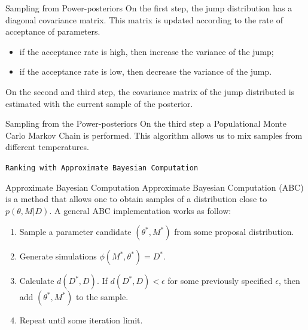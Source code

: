 \documentclass{beamer}
\begin{document}
\begin{frame}{Sampling from Power-posteriors}
On the first step, the jump distribution has a diagonal covariance 
matrix. \pause This matrix is updated according to the rate of 
acceptance of parameters.

\pause
\begin{itemize}
\item{if the acceptance rate is high, then increase the variance of the
    jump;}

\pause
\item{if the acceptance rate is low, then decrease the variance of the 
    jump.}
\end{itemize}

\pause
On the second and third step, the covariance matrix of the jump 
distributed is estimated with the current sample of the posterior.
\end{frame}

\begin{frame}{Sampling from the Power-posteriors}
On the third step a Populational Monte Carlo Markov Chain is performed.
This algorithm allows us to mix samples from different temperatures.
\end{frame}


\begin{frame}{}
\begin{center}
    \texttt{Ranking with Approximate Bayesian Computation}
\end{center}
\end{frame}


\begin{frame}{Approximate Bayesian Computation}
Approximate Bayesian Computation (ABC) is a method that allows one to
obtain samples of a distribution close to $p (\theta, M | D)$. \pause
A general ABC implementation works as follow:

\begin{enumerate}
    \pause
    \item{Sample a parameter candidate $(\theta^*, M^*)$ from some 
        proposal distribution.}
    \pause
    \item{Generate simulations $\phi (M^*, \theta^*) = D^*$.}
    \pause
    \item{Calculate $d (D^*, D).$ If $d (D^*, D) < \epsilon$ for some 
        previously specified $\epsilon$, then add $(\theta^*, M^*)$ to 
        the sample.}
    \pause
    \item{Repeat until some iteration limit.}
\end{enumerate}
\end{frame}
\end{document}
